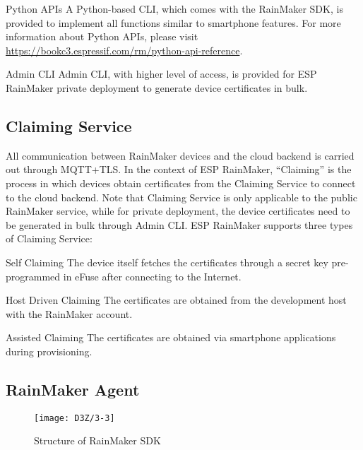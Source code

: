 \documentclass[a4paper,12pt]{book}
\begin{document}
\begin{term}{Python APIs}
    A Python-based CLI, which comes with the RainMaker SDK, is provided to implement all functions similar to smartphone features. For more information about Python APIs, please visit \url{https://bookc3.espressif.com/rm/python-api-reference}.
\end{term}

\begin{term}{Admin CLI}
    Admin CLI, with higher level of access, is provided for ESP RainMaker private deployment to generate device certificates in bulk.
\end{term}

\subsection{Claiming Service}

 All communication between RainMaker devices and the cloud backend is carried out through MQTT+TLS. In the context of ESP RainMaker, “Claiming” is the process in which devices obtain certificates from the Claiming Service to connect to the cloud backend. Note that Claiming Service is only applicable to the public RainMaker service, while for private deployment, the device certificates need to be generated in bulk through Admin CLI. ESP RainMaker supports three types of Claiming Service:

\begin{term}{Self Claiming}
    The device itself fetches the certificates through a secret key pre-programmed in eFuse after connecting to the Internet.
\end{term}

\begin{term}{Host Driven Claiming}
    The certificates are obtained from the development host with the RainMaker account.
\end{term}

\begin{term}{Assisted Claiming}
    The certificates are obtained via smartphone applications during provisioning.
\end{term}

\subsection{RainMaker Agent}
\begin{figure}[h!]
    \centering
    \texttt{[image: D3Z/3-3]}
    \caption{Structure of RainMaker SDK}
\end{figure}
\end{document}
